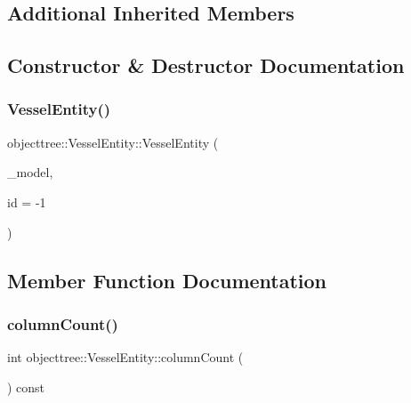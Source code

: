 \subsection*{Additional Inherited Members}


\subsection{Constructor \& Destructor Documentation}
\mbox{\label{classobjecttree_1_1_vessel_entity_acb3421a2e649b563ed60995a3a2d35cd}} 
\subsubsection{\texorpdfstring{VesselEntity()}{VesselEntity()}}
{\footnotesize\ttfamily objecttree\+::\+Vessel\+Entity\+::\+Vessel\+Entity (\begin{DoxyParamCaption}\item[{\mbox{\hyperlink{class_object_tree_model}{Object\+Tree\+Model}} $\ast$}]{\+\_\+model,  }\item[{int}]{id = {\ttfamily -\/1} }\end{DoxyParamCaption})}



\subsection{Member Function Documentation}
\mbox{\label{classobjecttree_1_1_vessel_entity_a89a8252acfb577ccf2ca5e75fa09ffb5}} 
\subsubsection{\texorpdfstring{columnCount()}{columnCount()}}
{\footnotesize\ttfamily int objecttree\+::\+Vessel\+Entity\+::column\+Count (\begin{DoxyParamCaption}{ }\end{DoxyParamCaption}) const\hspace{0.3cm}{\ttfamily [virtual]}}




